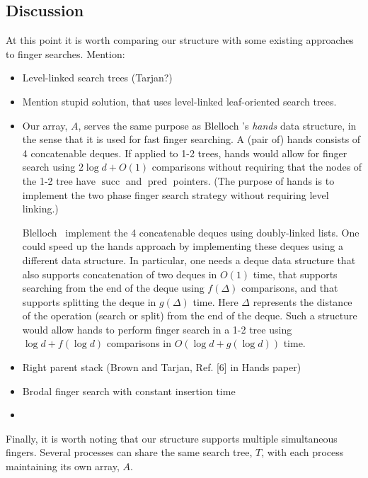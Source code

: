 \documentclass{patmorin}
\DeclareMathOperator{\scc}{succ}
\DeclareMathOperator{\pred}{pred}
\begin{document}
\subsection{Discussion}

At this point it is worth comparing our structure with some existing
approaches to finger searches.  Mention:
\begin{itemize}
  \item Level-linked search trees (Tarjan?)

  \item Mention stupid solution, that uses level-linked leaf-oriented
    search trees.

  \item Our array, $A$, serves the same purpose as Blelloch \etal's
    \emph{hands} data structure, in the sense that it is used for fast
    finger searching.  A (pair of) hands consists of 4 concatenable
    deques.  If applied to 1-2 trees, hands would allow for finger search
    using $2\log d+O(1)$ comparisons without requiring that the nodes
    of the 1-2 tree have $\scc$ and $\pred$ pointers.  (The purpose of
    hands is to implement the two phase finger search strategy without
    requiring level linking.)

    Blelloch \etal\ implement the 4 concatenable deques using
    doubly-linked lists.  One could speed up the hands approach
    by implementing these deques using a different data structure.
    In particular, one needs a deque data structure that also supports
    concatenation of two deques in $O(1)$ time, that supports searching
    from the end of the deque using $f(\Delta)$ comparisons, and that
    supports splitting the deque in $g(\Delta)$ time.  Here $\Delta$
    represents the distance of the operation (search or split) from the
    end of the deque.  Such a structure would allow hands to perform
    finger search in a 1-2 tree using $\log d + f(\log d)$ comparisons
    in $O(\log d + g(\log d))$ time.


  \item Right parent stack (Brown and Tarjan, Ref. [6] in Hands paper)
  \item Brodal finger search with constant insertion time
  \item 
\end{itemize}

Finally, it is worth noting that our structure supports multiple
simultaneous fingers.  Several processes can share the same search tree,
$T$, with each process maintaining its own array, $A$.
\end{document}
